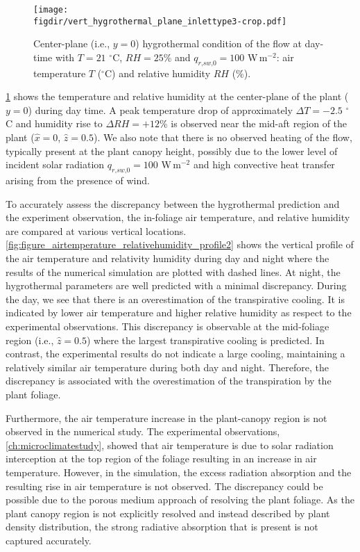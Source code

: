 \begin{figure}[h]
	\centering
	\texttt{[image: \\figdir/vert\_hygrothermal\_plane\_inlettype3-crop.pdf]}
	\caption{Center-plane (i.e., $y=0$) hygrothermal condition of the flow at day-time with $T = 21$ $^{\circ}$C, $\textit{RH}=25$\% and $q_{\textit{r,sw,0}} = 100$ W\,m$^{-2}$:  air temperature $T$ ($^{\circ}$C) and  relative humidity $\mathit{RH}$ (\%).}
	\label{fig:vert_hygrothermal_plane}
\end{figure}


\cref{fig:vert_hygrothermal_plane} shows the temperature and relative humidity at the center-plane of the plant ($y=0$) during day time. A peak temperature drop of approximately $\Delta T = -2.5$ $^{\circ}$C and humidity rise to $\Delta RH = +12$\% is observed near the mid-aft region of the plant ($\hat{x} = 0$, $\hat{z} = 0.5$). We also note that there is no observed heating of the flow, typically present at the plant canopy height, possibly due to the lower level of incident solar radiation $q_{\textit{r,sw,0}} = 100$ W\,m$^{-2}$ and high convective heat transfer arising from the presence of wind. 

To accurately assess the discrepancy between the hygrothermal prediction and the experiment observation, the in-foliage air temperature, and relative humidity are compared at various vertical locations. \cref{fig:figure_airtemperature_relativehumidity_profile2} shows the vertical profile of the air temperature and relativity humidity during day and night where the results of the numerical simulation are plotted with dashed lines. At night, the hygrothermal parameters are well predicted with a minimal discrepancy. During the day, we see that there is an overestimation of the transpirative cooling. It is indicated by lower air temperature and higher relative humidity as respect to the experimental observations. This discrepancy is observable at the mid-foliage region (i.e., $\hat{z} = 0.5$) where the largest transpirative cooling is predicted. In contrast, the experimental results do not indicate a large cooling, maintaining a relatively similar air temperature during both day and night. Therefore, the discrepancy is associated with the overestimation of the transpiration by the plant foliage.

Furthermore, the air temperature increase in the plant-canopy region is not observed in the numerical study. The experimental observations, \cref{ch:microclimatestudy}, showed that air temperature is due to solar radiation interception at the top region of the foliage resulting in an increase in air temperature. However, in the simulation, the excess radiation absorption and the resulting rise in air temperature is not observed. The discrepancy could be possible due to the porous medium approach of resolving the plant foliage. As the plant canopy region is not explicitly resolved and instead described by plant density distribution, the strong radiative absorption that is present is not captured accurately. 


